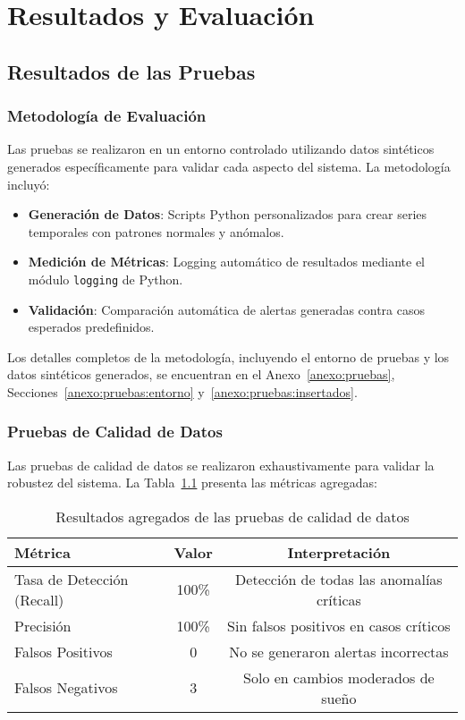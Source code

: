 \chapter{Resultados y Evaluación}

\section{Resultados de las Pruebas}

\subsection{Metodología de Evaluación}
Las pruebas se realizaron en un entorno controlado utilizando datos sintéticos generados específicamente para validar cada aspecto del sistema. La metodología incluyó:

\begin{itemize}
    \item \textbf{Generación de Datos}: Scripts Python personalizados para crear series temporales con patrones normales y anómalos.
    \item \textbf{Medición de Métricas}: Logging automático de resultados mediante el módulo \texttt{logging} de Python.
    \item \textbf{Validación}: Comparación automática de alertas generadas contra casos esperados predefinidos.
\end{itemize}

Los detalles completos de la metodología, incluyendo el entorno de pruebas y los datos sintéticos generados, se encuentran en el Anexo~\ref{anexo:pruebas}, Secciones~\ref{anexo:pruebas:entorno} y~\ref{anexo:pruebas:insertados}.

\subsection{Pruebas de Calidad de Datos}
Las pruebas de calidad de datos se realizaron exhaustivamente para validar la robustez del sistema. La Tabla~\ref{tab:resultados_calidad} presenta las métricas agregadas:

\begin{table}[H]
\centering
\caption{Resultados agregados de las pruebas de calidad de datos}
\label{tab:resultados_calidad}
\begin{tabular}{|l|c|c|}
\hline
\textbf{Métrica} & \textbf{Valor} & \textbf{Interpretación} \\ \hline
Tasa de Detección (Recall) & 100\% & Detección de todas las anomalías críticas \\
Precisión & 100\% & Sin falsos positivos en casos críticos \\
Falsos Positivos & 0 & No se generaron alertas incorrectas \\
Falsos Negativos & 3 & Solo en cambios moderados de sueño \\
\hline
\end{tabular}
\end{table}

